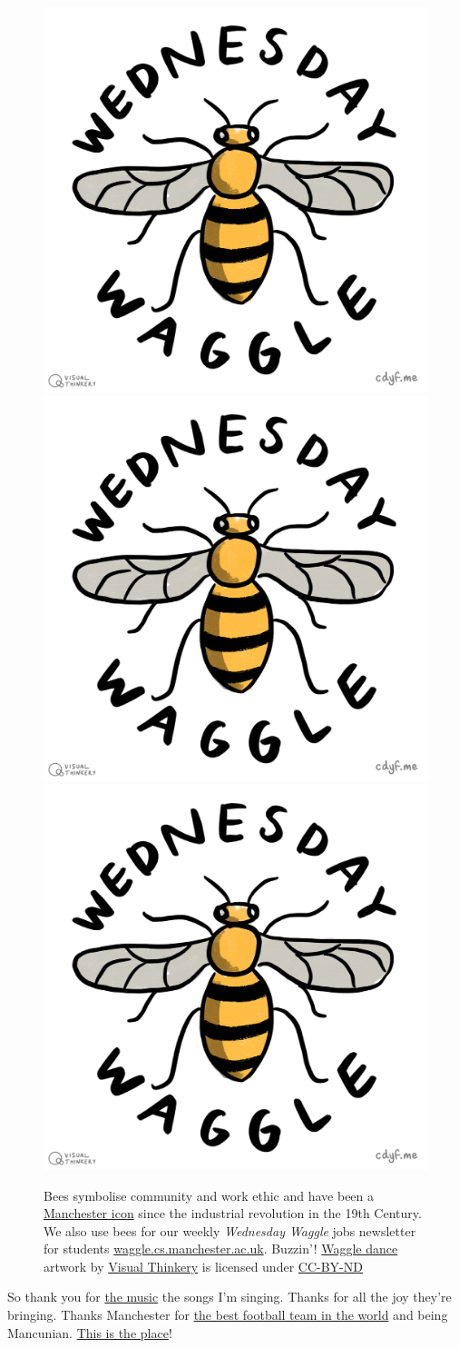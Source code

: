 \documentclass[
]{book}
\begin{document}
\begin{figure}
\includegraphics[width=0.33\linewidth]{images/Wednesday_Waggle} \includegraphics[width=0.33\linewidth]{images/Wednesday_Waggle} \includegraphics[width=0.33\linewidth]{images/Wednesday_Waggle} \caption{Bees symbolise community and work ethic and have been a \href{https://en.wikipedia.org/wiki/Symbols_of_Manchester}{Manchester icon} since the industrial revolution in the 19th Century. We also use bees for our weekly \emph{Wednesday Waggle} jobs newsletter for students \href{https://waggle.cs.manchester.ac.uk/}{waggle.cs.manchester.ac.uk}. Buzzin'! \href{https://en.wikipedia.org/wiki/Waggle_dance}{Waggle dance} artwork by \href{https://visualthinkery.com/}{Visual Thinkery} is licensed under \href{https://creativecommons.org/licenses/by-nd/4.0/}{CC-BY-ND} 🐝}\label{fig:waggle-fig}
\end{figure}



So thank you for \href{https://en.wikipedia.org/wiki/Popular_music_of_Manchester}{the music} the songs I'm singing. Thanks for all the joy they're bringing. Thanks Manchester for \href{https://en.wikipedia.org/wiki/Manchester_United_F.C.}{the best football team in the world} and being Mancunian. \href{https://www.youtube.com/watch?v=PszMmYpQjPo}{This is the place}! \citep{longfella} 🙏
\end{document}
